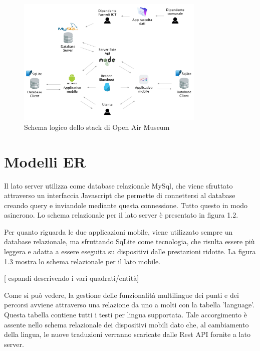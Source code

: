 \begin{figure}[h]
\centering
\includegraphics[width=0.8\textwidth]{images/SchemaOpenAirMuseum.png}
\caption{Schema logico dello stack di Open Air Museum}
\end{figure}

\section{Modelli ER}\vspace{5mm}
		
	Il lato server utilizza come database relazionale MySql, che viene sfruttato attraverso un interfaccia Javascript che permette di connettersi al database creando query e inviandole mediante questa connessione. Tutto questo in modo asincrono. Lo schema relazionale per il lato server è presentato in figura 1.2.\vspace{5mm}
	
	Per quanto riguarda le due applicazioni mobile, viene utilizzato sempre un database relazionale, ma sfruttando SqLite come tecnologia, che risulta essere più leggera e adatta a essere eseguita su dispositivi dalle prestazioni ridotte. La figura 1.3 mostra lo schema relazionale per il lato mobile.\vspace{5mm}
	
	[ espandi descrivendo i vari quadrati/entità]\vspace{5mm}

Come si può vedere, la gestione delle funzionalità multilingue dei punti e dei percorsi avviene attraverso una relazione da uno a molti con la tabella 'language'. Questa tabella contiene tutti i testi per lingua supportata. Tale accorgimento è assente nello schema relazionale dei dispositivi mobili dato che, al cambiamento della lingua, le nuove traduzioni verranno scaricate dalle Rest API fornite a lato server.


